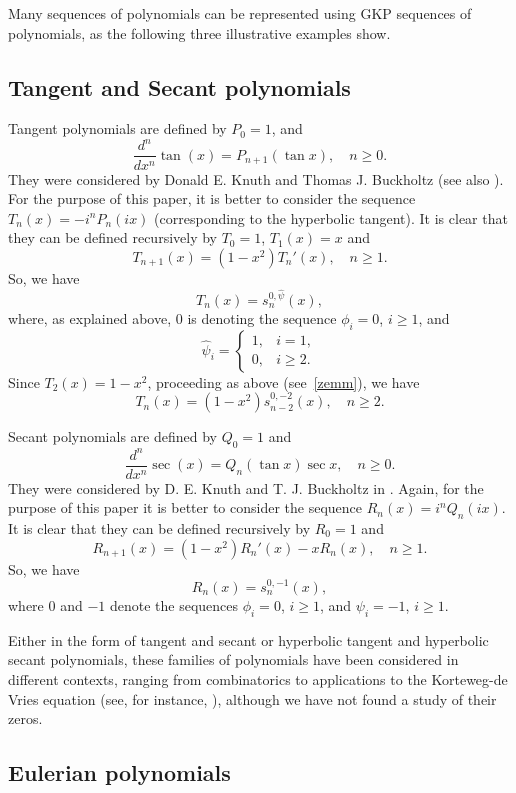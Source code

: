 \documentclass[10pt, a4paper, leqno]{amsart}
\numberwithin{equation}{section}
\theoremstyle{plain}
\theoremstyle{remark}
\begin{document}
Many sequences of polynomials can be represented using GKP sequences of polynomials, as the following three illustrative examples show.

\subsection{Tangent and Secant polynomials}

Tangent polynomials are defined by $P_0=1$, and
\[
  \frac{d^n}{dx^n}\tan (x) = P_{n+1}(\tan x), \quad n\ge 0.
\]
They were considered by Donald E. Knuth and Thomas J. Buckholtz \cite{Knuth-B} (see also
\cite[(6.94), p.~287]{Knuth-libro}).
For the purpose of this paper, it is better to consider the sequence $T_n(x) = -i^nP_n(ix)$ (corresponding to the hyperbolic tangent). It is clear that they can be defined recursively by $T_0=1$, $T_1(x)=x$ and
\[
  T_{n+1}(x) = (1-x^2)T_n'(x),\quad n\ge 1.
\]
So, we have
\[
  T_n(x) = s_n^{0,\hat\psi}(x),
\]
where, as explained above, $0$ is denoting the sequence $\phi_i=0$, $i\ge 1$, and
\[
  \hat\psi_i = 
  \begin{cases} 1,&i=1,\\ 0,&i\ge 2.\end{cases}
\]
Since $T_2(x) = 1-x^2$, proceeding as above (see~\eqref{zemm}), we have
\[
  T_n(x) = (1-x^2)s_{n-2}^{0,-2}(x), \quad n \ge 2.
\]

Secant polynomials are defined by $Q_0=1$ and
\[
\frac{d^n}{dx^n}\sec (x) = Q_{n}(\tan x)\sec x,\quad n\ge 0.
\]
They were considered by D. E. Knuth and T. J. Buckholtz in \cite{Knuth-B}. 
Again, for the purpose of this paper it is better to consider the sequence $R_n(x) = i^nQ_n(ix)$. 
It is clear that they can be defined recursively by $R_0=1$ and
\[
  R_{n+1}(x) = (1-x^2)R_n'(x)-xR_n(x),\quad n\ge 1.
\]
So, we have
\[
  R_n(x) = s_n^{0,-1}(x),
\]
where $0$ and $-1$ denote the sequences $\phi_i=0$, $i\ge 1$, and
$\psi_i=-1$, $i\ge 1$.

Either in the form of tangent and secant or hyperbolic tangent and hyperbolic secant polynomials, these families of polynomials have been considered in different contexts, ranging from combinatorics to applications to the Korteweg-de Vries equation (see, for instance, \cite{Knuth-libro, Knuth-B, Hoff1995, Hoff1999, GV, Boy}), although we have not found a study of their zeros.

\subsection{Eulerian polynomials}
\end{document}
